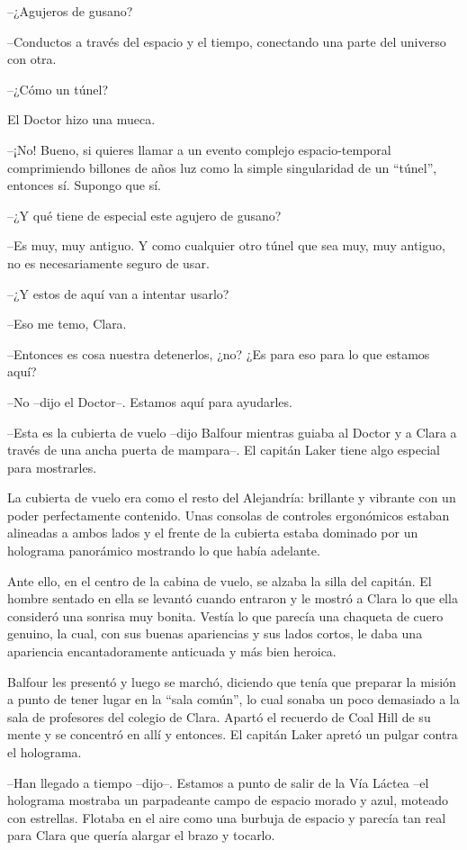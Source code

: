 {--¿Agujeros de gusano?}

{--Conductos a través del espacio y el tiempo, conectando una parte del
universo con otra.}

{--¿Cómo un túnel?}

{El Doctor hizo una mueca.}

{--¡No! Bueno, si quieres llamar a un evento complejo espacio-temporal
 comprimiendo billones de años luz como la simple singularidad de un
``túnel'', entonces sí. Supongo que sí.}

{--¿Y qué tiene de especial este agujero de gusano?}

{--Es muy, muy antiguo. Y como cualquier otro túnel que sea muy, muy
antiguo, no es necesariamente seguro de usar.}

{--¿Y estos de aquí van a intentar usarlo?}

{--Eso me temo, Clara.}

{--Entonces es cosa nuestra detenerlos, ¿no? ¿Es para eso para lo que
estamos aquí?}

{--No --dijo el Doctor--. Estamos aquí para
ayudarles.}

{--Esta es la cubierta de vuelo --dijo
 Balfour mientras guiaba al Doctor y a Clara a través de una ancha puerta
de mampara--. El capitán Laker tiene algo especial para mostrarles.}

{La cubierta de vuelo era como el resto del Alejandría: brillante y
 vibrante con un poder perfectamente contenido. Unas consolas de
 controles ergonómicos estaban alineadas a ambos lados y el frente de la
 cubierta estaba dominado por un holograma panorámico mostrando lo que
había adelante.}

{Ante ello, en el centro de la cabina de vuelo, se alzaba la silla del
 capitán. El hombre sentado en ella se levantó cuando entraron y le
 mostró a Clara lo que ella consideró una sonrisa muy bonita. Vestía lo
 que parecía una chaqueta de cuero genuino, la cual, con sus buenas
 apariencias y sus lados cortos, le daba una apariencia encantadoramente
anticuada y más bien heroica.}

{Balfour les presentó y luego se marchó, diciendo que tenía que preparar
 la misión a punto de tener lugar en la ``sala común'', lo cual sonaba un
 poco demasiado a la sala de profesores del colegio de Clara. Apartó el
 recuerdo de Coal Hill de su mente y se concentró en allí y entonces. El
capitán Laker apretó un pulgar contra el holograma.}

{--Han llegado a tiempo --dijo--. Estamos a punto de salir de la Vía
 Láctea --el holograma mostraba un parpadeante campo de espacio morado y
 azul, moteado con estrellas. Flotaba en el aire como una burbuja de
 espacio y parecía tan real para Clara que quería alargar el brazo y
tocarlo.}

